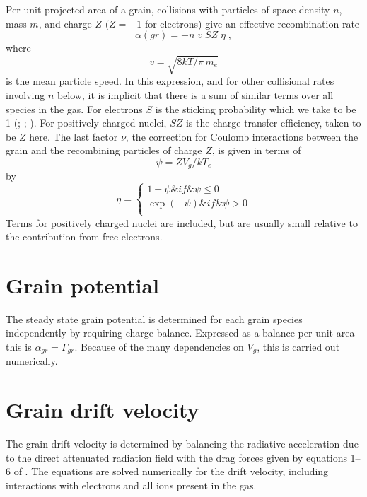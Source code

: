 Per unit projected area of a grain, collisions with particles of space
density $n$, mass $m$, and charge $Z$ $(Z = -1$ for electrons) give an effective
recombination rate
\begin{equation}
\alpha \left( {gr} \right) =  - n\;\bar v\;SZ\;\eta \;,
\end{equation}
where
\begin{equation}
\bar v = \sqrt {8kT/\pi \,{m_e}}
\end{equation}
is the mean particle speed.  In this expression, and for other collisional
rates involving $n$ below, it is implicit that there is a sum of similar terms
over all species in the gas.  For electrons $S$ is the sticking probability
which we take to be 1 (\citealp{Spitzer1948}; \citealp{Watson1972}; \citealp{Draine1978}).  For
positively charged nuclei, $SZ$ is the charge transfer efficiency, taken to
be $Z$ here.  The last factor $\nu$, the correction for Coulomb interactions between
the grain and the recombining particles of charge $Z$, is given in terms of
\begin{equation}
\psi  = Z{V_g}/k{T_e}
\end{equation}
by
\begin{equation}
\eta  = \left\{ {\begin{array}{*{20}{c}}
   {1 - \psi } \& {if} \& {\psi  \le 0}  \\
   {\exp \left( { - \psi } \right)} \& {if} \& {\psi  > 0}  \\
\end{array}} \right.
\end{equation}
Terms for positively charged nuclei are included, but are usually small
relative to the contribution from free electrons.

\section{Grain potential}

The steady state grain potential is determined for each grain species
independently by requiring charge balance.  Expressed as a balance per unit
area this is $\alpha_{gr} = \Gamma_{gr}$. Because of the many dependencies
on $V_g$, this is carried
out numerically.

\section{Grain drift velocity}

The grain drift velocity is determined by balancing the radiative
acceleration due to the direct attenuated radiation field with the drag
forces given by equations 1--6 of \citet{Draine1979}.  The equations
are solved numerically for the drift velocity, including interactions with
electrons and all ions present in the gas.

